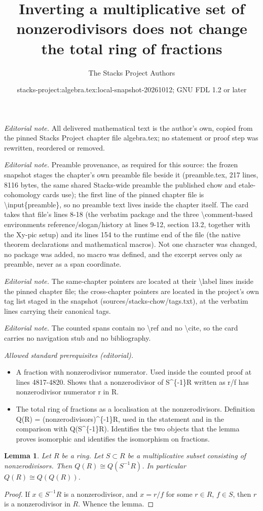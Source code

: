 \documentclass[10pt,a4paper]{amsart}
\title{Inverting a multiplicative set of nonzerodivisors does not change the total ring of fractions}
\author{The Stacks Project Authors}
\date{stacks-project:algebra.tex:local-snapshot-20261012; GNU FDL 1.2 or later}
\theoremstyle{plain}
\newtheorem{lemma}[subsection]{Lemma}
\theoremstyle{definition}
\theoremstyle{remark}
\numberwithin{equation}{subsection}
\begin{document}
\maketitle
\noindent\textit{Editorial note.} All delivered mathematical text is the author's own, copied from the pinned Stacks Project chapter file algebra.tex; no statement or proof step was rewritten, reordered or removed.\par\medskip
\noindent\textit{Editorial note.} Preamble provenance, as required for this source: the frozen snapshot stages the chapter's own preamble file beside it (preamble.tex, 217 lines, 8116 bytes, the same shared Stacks-wide preamble the published chow and etale-cohomology cards use); the first line of the pinned chapter file is \textbackslash{}input\{preamble\}, so no preamble text lives inside the chapter itself. The card takes that file's lines 8-18 (the verbatim package and the three \textbackslash{}comment-based environments reference/slogan/history at lines 9-12, section 13.2, together with the Xy-pic setup) and its lines 154 to the runtime end of the file (the native theorem declarations and mathematical macros). Not one character was changed, no package was added, no macro was defined, and the excerpt serves only as preamble, never as a span coordinate.\par\medskip
\noindent\textit{Editorial note.} The same-chapter pointers are located at their \textbackslash{}label lines inside the pinned chapter file; the cross-chapter pointers are located in the project's own tag list staged in the snapshot (sources/stacks-chow/tags.txt), at the verbatim lines carrying their canonical tags.\par\medskip
\noindent\textit{Editorial note.} The counted spans contain no \textbackslash{}ref and no \textbackslash{}cite, so the card carries no navigation stub and no bibliography.\par\medskip
\noindent\textit{Allowed standard prerequisites (editorial).}\begin{itemize}
\item A fraction with nonzerodivisor numerator. Used inside the counted proof at lines 4817-4820. Shows that a nonzerodivisor of S\textasciicircum{}\{-1\}R written as r/f has nonzerodivisor numerator r in R.
\item The total ring of fractions as a localisation at the nonzerodivisors. Definition Q(R) = (nonzerodivisors)\textasciicircum{}\{-1\}R, used in the statement and in the comparison with Q(S\textasciicircum{}\{-1\}R). Identifies the two objects that the lemma proves isomorphic and identifies the isomorphism on fractions.
\end{itemize}\medskip
\begin{lemma}
\label{lemma-total-ring-fractions}
Let $R$ be a ring.
Let $S \subset R$ be a multiplicative subset consisting of nonzerodivisors.
Then $Q(R) \cong Q(S^{-1}R)$.
In particular $Q(R) \cong Q(Q(R))$.
\end{lemma}

\begin{proof}
If $x \in S^{-1}R$ is a nonzerodivisor, and
$x = r/f$ for some $r \in R$, $f \in S$, then
$r$ is a nonzerodivisor in $R$. Whence the lemma.
\end{proof}
\end{document}
